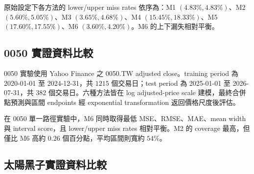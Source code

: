 {原始設定下各方法的 lower/upper miss rates 依序為：M1 $(4.83\%,4.83\%)$、M2 $(5.60\%,5.05\%)$、M3 $(3.65\%,4.68\%)$、M4 $(15.45\%,18.33\%)$、M5 $(17.60\%,17.55\%)$、M6 $(3.60\%,4.20\%)$。M6 的上下漏失相對平衡。

\subsection*{0050 實證資料比較}

0050 實驗使用 Yahoo Finance 之 0050.TW adjusted close。training period 為 2020-01-01 至 2024-12-31，共 $1215$ 個交易日；test period 為 2025-01-01 至 2026-07-31，共 $382$ 個交易日。六種方法皆在 log adjusted-price scale 建模，最終合併點預測與區間 endpoints 經 exponential transformation 返回價格尺度後評估。

\begin{table}[htbp]
\centering
\caption{0050.TW 原始超參數之點預測與區間預測比較}
\label{tab:0050-original}
\end{table}

在 0050 單一路徑實驗中，M6 同時取得最低 MSE、RMSE、MAE、mean width 與 interval score，且 lower/upper miss rates 相對平衡。M2 的 coverage 最高，但僅比 M6 高約 $0.26$ 個百分點，平均區間則寬約 $54\%$。

\subsection*{太陽黑子實證資料比較}

}
